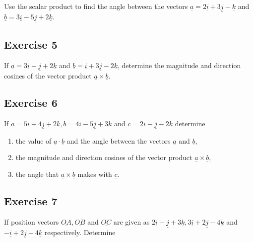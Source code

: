 \documentclass[
  11pt,
  oneside]{book}
\providecommand{\tightlist}{%
  \setlength{\itemsep}{0pt}\setlength{\parskip}{0pt}}
\newcommand{\slide}{}
\theoremstyle{definition}
\theoremstyle{definition}
\theoremstyle{definition}
\theoremstyle{definition}
\theoremstyle{remark}
\begin{document}
Use the scalar product to find the angle between the vectors \(\underline{a}=2\underline{i} + 3\underline{j} - \underline{k}\) and \(\underline{b}=3\underline{i} - 5\underline{j} + 2\underline{k}\).

\slide

\subsection*{Exercise 5}\label{exercise-5-8}

If \(\underline{a} = 3\underline{i} - \underline{j} + 2\underline{k}\) and \(\underline{b} = \underline{i} + 3\underline{j} - 2\underline{k}\), determine the magnitude and direction cosines of the vector product \(\underline{a} \times \underline{b}\).

\slide

\subsection*{Exercise 6}\label{exercise-6-6}

If \(\underline{a} = 5\underline{i} + 4\underline{j} + 2\underline{k}, \underline{b} = 4\underline{i} - 5\underline{j} + 3\underline{k}\) and \(\underline{c} = 2\underline{i} - \underline{j} - 2\underline{k}\) determine

\begin{enumerate}
\def\labelenumi{\arabic{enumi}.}
\tightlist
\item
  the value of \(\underline{a} \cdot \underline{b}\) and the angle between the vectors \(\underline{a}\) and \(\underline{b}\),
\item
  the magnitude and direction cosines of the vector product \(\underline{a} \times \underline{b}\),
\item
  the angle that \(\underline{a} \times \underline{b}\) makes with \(\underline{c}\).
\end{enumerate}

\slide

\subsection*{Exercise 7}\label{exercise-7-3}

If position vectors \(\underline{OA}, \underline{OB}\) and \(\underline{OC}\) are given as \(2\underline{i} - \underline{j} + 3\underline{k}, 3\underline{i} + 2\underline{j} - 4\underline{k}\) and \(-\underline{i} + 2\underline{j} - 4\underline{k}\) respectively. Determine
\end{document}
